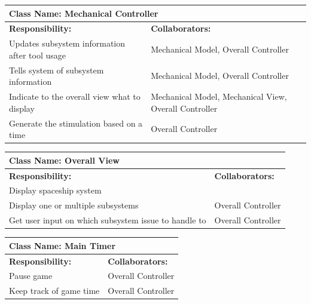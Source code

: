 \documentclass[12pt, titlepage]{article}
\begin{document}
\begin{enumerate}[a)]
	\begin{table}[H]
		\centering
		\begin{tabular}{|p{10cm}|p{5cm}|}
		\hline 
		 \multicolumn{2}{|l|}{\textbf{Class Name: Mechanical Controller}} \\
		\hline
		\textbf{Responsibility:} & \textbf{Collaborators:} \\
		\hline
		Updates subsystem information after tool usage & Mechanical Model, Overall Controller\\
		\hline
		 Tells system of subsystem information & Mechanical Model, Overall Controller\\
		\hline
		 Indicate to the overall view what to display & Mechanical Model, Mechanical View, Overall Controller\\
		\hline
		 Generate the stimulation based on a time & Overall Controller \\
		\hline
		\end{tabular}
	\end{table}

	\begin{table}[H]
		\centering
		\begin{tabular}{|p{10cm}|p{5cm}|}
		\hline 
		 \multicolumn{2}{|l|}{\textbf{Class Name: Overall View}} \\
		\hline
		\textbf{Responsibility:} & \textbf{Collaborators:} \\
		\hline
		 Display spaceship system & \\
		\hline
		Display one or multiple subsystems & Overall Controller\\
		\hline
		Get user input on which subsystem issue to handle to & Overall Controller \\
		\hline
		\end{tabular}
	\end{table}

	\begin{table}[H]
		\centering
		\begin{tabular}{|p{10cm}|p{5cm}|}
		\hline 
		 \multicolumn{2}{|l|}{\textbf{Class Name: Main Timer}} \\
		\hline
		\textbf{Responsibility:} & \textbf{Collaborators:} \\
		\hline
		 Pause game & Overall Controller \\
		\hline
		 Keep track of game time & Overall Controller\\
		\hline
		\end{tabular}
	\end{table}


\end{enumerate}
\end{document}
